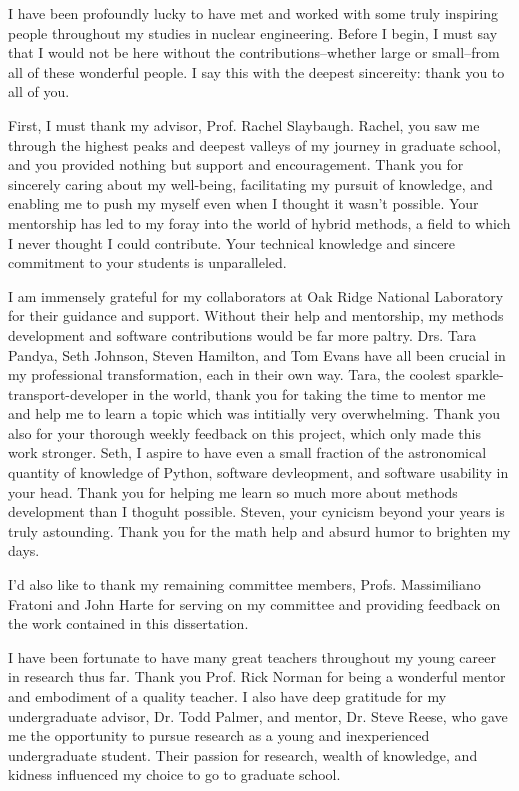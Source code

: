 
\begin{acknowledgements}

I have been profoundly lucky to have met and worked with some truly inspiring
people throughout my studies in nuclear engineering. Before I begin, I must say
that I would not be here without the contributions--whether large or small--from
all of these wonderful people. I say this with the deepest sincereity: thank you
to all of you.

First, I must thank my advisor, Prof. Rachel Slaybaugh. Rachel, you saw me through
the highest peaks and deepest valleys of my journey in
graduate school, and you provided
nothing but support and encouragement. Thank you for sincerely caring about my
well-being, facilitating my pursuit of knowledge, and enabling me to
push my myself even when I thought it wasn't possible.
Your mentorship has led to my foray into the world
of hybrid methods,
a field to which I never thought I could contribute. Your technical
knowledge and sincere commitment to your students is unparalleled.

I am immensely grateful for my collaborators at Oak Ridge National Laboratory
for their guidance and support. Without their help and mentorship,
my methods development and
software contributions would be far more paltry. Drs. Tara Pandya, Seth Johnson,
Steven Hamilton, and Tom Evans have all been crucial in my professional
transformation, each in their own way.
Tara, the coolest sparkle-transport-developer in the world, thank you for taking
the time to mentor me and help me to learn a topic which was intitially very
overwhelming. Thank you also for your thorough weekly feedback on this project,
which only made this work stronger.
Seth, I aspire to have even a small fraction of
the astronomical quantity of knowledge of Python, software devleopment, and
software usability in your head. Thank you for helping me learn so much more
about methods development than I thoguht possible.
Steven, your cynicism beyond your years is truly astounding. Thank you for the
math help and absurd humor to brighten my days.

I'd also like to thank my remaining committee members,
Profs. Massimiliano Fratoni and John Harte
for serving on my committee and providing feedback on the work contained in this
dissertation.

I have been fortunate to have many great teachers throughout my young career in
research thus far. Thank you Prof. Rick Norman for being a wonderful mentor and
embodiment of a quality teacher. I also have deep gratitude for my undergraduate
advisor, Dr. Todd Palmer, and mentor, Dr. Steve Reese, who gave me the
opportunity to pursue research as a young and inexperienced undergraduate
student. Their
passion for research, wealth of knowledge, and kidness
influenced my choice to go to graduate school.


\end{acknowledgements}
